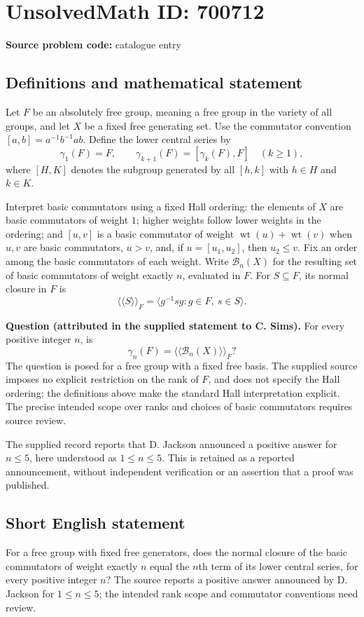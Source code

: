 \documentclass[11pt]{article}
\begin{document}
\section*{UnsolvedMath ID: 700712}
\textbf{Source problem code:} catalogue entry
\subsection{Definitions and mathematical statement}
Let \(F\) be an absolutely free group, meaning a free group in the variety of all groups, and let \(X\) be a fixed free generating set. Use the commutator convention \([a,b]=a^{-1}b^{-1}ab\). Define the lower central series by
\[
\gamma_1(F)=F,\qquad \gamma_{k+1}(F)=[\gamma_k(F),F]\quad(k\geq 1),
\]
where \([H,K]\) denotes the subgroup generated by all \([h,k]\) with \(h\in H\) and \(k\in K\).

Interpret basic commutators using a fixed Hall ordering: the elements of \(X\) are basic commutators of weight \(1\); higher weights follow lower weights in the ordering; and \([u,v]\) is a basic commutator of weight \(\operatorname{wt}(u)+\operatorname{wt}(v)\) when \(u,v\) are basic commutators, \(u>v\), and, if \(u=[u_1,u_2]\), then \(u_2\leq v\). Fix an order among the basic commutators of each weight. Write \(\mathcal B_n(X)\) for the resulting set of basic commutators of weight exactly \(n\), evaluated in \(F\). For \(S\subseteq F\), its normal closure in \(F\) is
\[
\langle\!\langle S\rangle\!\rangle_F
=\bigl\langle g^{-1}sg : g\in F,\ s\in S\bigr\rangle.
\]

\textbf{Question (attributed in the supplied statement to C. Sims).} For every positive integer \(n\), is
\[
\gamma_n(F)=\langle\!\langle\mathcal B_n(X)\rangle\!\rangle_F?
\]
The question is posed for a free group with a fixed free basis. The supplied source imposes no explicit restriction on the rank of \(F\), and does not specify the Hall ordering; the definitions above make the standard Hall interpretation explicit. The precise intended scope over ranks and choices of basic commutators requires source review.

The supplied record reports that D. Jackson announced a positive answer for \(n\leq 5\), here understood as \(1\leq n\leq 5\). This is retained as a reported announcement, without independent verification or an assertion that a proof was published.
\subsection{Short English statement}
For a free group with fixed free generators, does the normal closure of the basic commutators of weight exactly \(n\) equal the \(n\)th term of its lower central series, for every positive integer \(n\)? The source reports a positive answer announced by D. Jackson for \(1\leq n\leq 5\); the intended rank scope and commutator conventions need review.
\end{document}
